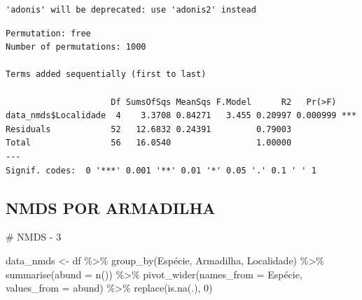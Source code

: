 \documentclass[
  letterpaper,
  DIV=11,
  numbers=noendperiod]{scrartcl}
\newenvironment{Shaded}{\begin{snugshade}}{\end{snugshade}}
\newcommand{\AttributeTok}[1]{\textcolor[rgb]{0.40,0.45,0.13}{#1}}
\newcommand{\CommentTok}[1]{\textcolor[rgb]{0.37,0.37,0.37}{#1}}
\newcommand{\DecValTok}[1]{\textcolor[rgb]{0.68,0.00,0.00}{#1}}
\newcommand{\FunctionTok}[1]{\textcolor[rgb]{0.28,0.35,0.67}{#1}}
\newcommand{\NormalTok}[1]{\textcolor[rgb]{0.00,0.23,0.31}{#1}}
\newcommand{\OtherTok}[1]{\textcolor[rgb]{0.00,0.23,0.31}{#1}}
\newcommand{\SpecialCharTok}[1]{\textcolor[rgb]{0.37,0.37,0.37}{#1}}
\begin{document}
\begin{Shaded}
\end{Shaded}

\begin{verbatim}
'adonis' will be deprecated: use 'adonis2' instead
\end{verbatim}

\begin{Shaded}
\end{Shaded}

\begin{verbatim}
Permutation: free
Number of permutations: 1000

Terms added sequentially (first to last)

                     Df SumsOfSqs MeanSqs F.Model      R2   Pr(>F)    
data_nmds$Localidade  4    3.3708 0.84271   3.455 0.20997 0.000999 ***
Residuals            52   12.6832 0.24391         0.79003             
Total                56   16.0540                 1.00000             
---
Signif. codes:  0 '***' 0.001 '**' 0.01 '*' 0.05 '.' 0.1 ' ' 1
\end{verbatim}

\hypertarget{nmds-por-armadilha}{%
\subsection{NMDS POR ARMADILHA}\label{nmds-por-armadilha}}

\begin{Shaded}
\begin{Highlighting}[]
\CommentTok{\# NMDS {-} 3 }

\NormalTok{data\_nmds }\OtherTok{\textless{}{-}} 
\NormalTok{  df }\SpecialCharTok{\%\textgreater{}\%}
  \FunctionTok{group\_by}\NormalTok{(Espécie, Armadilha, Localidade) }\SpecialCharTok{\%\textgreater{}\%}
  \FunctionTok{summarise}\NormalTok{(}\AttributeTok{abund =} \FunctionTok{n}\NormalTok{()) }\SpecialCharTok{\%\textgreater{}\%}
  \FunctionTok{pivot\_wider}\NormalTok{(}\AttributeTok{names\_from =}\NormalTok{ Espécie, }\AttributeTok{values\_from =}\NormalTok{ abund) }\SpecialCharTok{\%\textgreater{}\%}
  \FunctionTok{replace}\NormalTok{(}\FunctionTok{is.na}\NormalTok{(.), }\DecValTok{0}\NormalTok{)}
\end{Highlighting}
\end{Shaded}
\end{document}
